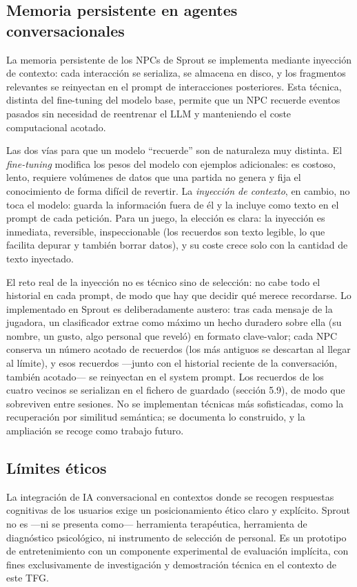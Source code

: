 \documentclass[12pt,twoside,titlepage]{report}
\begin{document}
\subsection{Memoria persistente en agentes conversacionales}

La memoria persistente de los NPCs de Sprout se implementa mediante inyección de contexto: cada interacción se serializa, se almacena en disco, y los fragmentos relevantes se reinyectan en el prompt de interacciones posteriores. Esta técnica, distinta del fine-tuning del modelo base, permite que un NPC recuerde eventos pasados sin necesidad de reentrenar el LLM y manteniendo el coste computacional acotado.

Las dos vías para que un modelo ``recuerde'' son de naturaleza muy distinta. El \textit{fine-tuning} modifica los pesos del modelo con ejemplos adicionales: es costoso, lento, requiere volúmenes de datos que una partida no genera y fija el conocimiento de forma difícil de revertir. La \textit{inyección de contexto}, en cambio, no toca el modelo: guarda la información fuera de él y la incluye como texto en el prompt de cada petición. Para un juego, la elección es clara: la inyección es inmediata, reversible, inspeccionable (los recuerdos son texto legible, lo que facilita depurar y también borrar datos), y su coste crece solo con la cantidad de texto inyectado.

El reto real de la inyección no es técnico sino de selección: no cabe todo el historial en cada prompt, de modo que hay que decidir qué merece recordarse. Lo implementado en Sprout es deliberadamente austero: tras cada mensaje de la jugadora, un clasificador extrae como máximo un hecho duradero sobre ella (su nombre, un gusto, algo personal que reveló) en formato clave-valor; cada NPC conserva un número acotado de recuerdos (los más antiguos se descartan al llegar al límite), y esos recuerdos ---junto con el historial reciente de la conversación, también acotado--- se reinyectan en el system prompt. Los recuerdos de los cuatro vecinos se serializan en el fichero de guardado (sección 5.9), de modo que sobreviven entre sesiones. No se implementan técnicas más sofisticadas, como la recuperación por similitud semántica; se documenta lo construido, y la ampliación se recoge como trabajo futuro.

\subsection{Límites éticos}

La integración de IA conversacional en contextos donde se recogen respuestas cognitivas de los usuarios exige un posicionamiento ético claro y explícito. Sprout no es ---ni se presenta como--- herramienta terapéutica, herramienta de diagnóstico psicológico, ni instrumento de selección de personal. Es un prototipo de entretenimiento con un componente experimental de evaluación implícita, con fines exclusivamente de investigación y demostración técnica en el contexto de este TFG.
\end{document}
